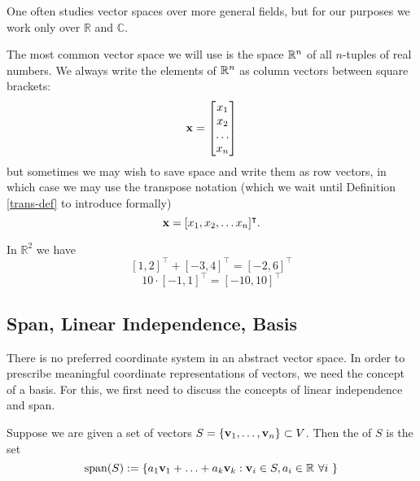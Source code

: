 \begin{remark}
    One often studies vector spaces over more general fields, but for our purposes we work only over $\mathbb{R}$ and $\mathbb C$.
\end{remark}

The most common vector space we will use is the space $\R^n$ of all $n$-tuples of real numbers. We always write the elements of $\R^n$ as column vectors between square brackets:
$$\vx = \begin{bmatrix}x_1\\x_2\\\dots\\x_n\end{bmatrix}$$
but sometimes we may wish to save space and write them as row vectors, in which case we may use the transpose notation (which we wait until Definition \ref{trans-def} to introduce formally)
$$\vx = [x_1, x_2, \dots x_n]^\intercal.$$

\begin{example}
In $\mathbb R^2 $ we have
$$[1,2]^\intercal + [-3,4]^\intercal = [-2,6]^\intercal$$
$$10 \cdot [-1,1]^\intercal = [-10,10]^\intercal$$
\end{example}

\subsection{Span, Linear Independence, Basis}

There is no preferred coordinate system in an abstract vector space. In order to prescribe meaningful coordinate representations of vectors, we need the concept of a basis. For this, we first need to discuss the concepts of linear independence and span.

\begin{definition}
Suppose we are given a set of vectors $S = \{\vv_1, \ldots, \vv_n \} \subset V$. Then the  of $S$ is the set 
$$\spann(S) := \{a_1\vv_1 + \ldots + a_k \vv_k : \vv_i \in S, a_i \in \mathbb R \ \forall i \ \}$$
\end{definition}

